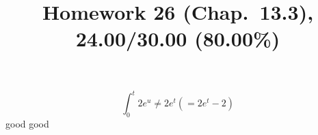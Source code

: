 \documentclass[10pt]{article} %
\title{Homework 26 (Chap.~13.3),
24.00/30.00 (80.00\%)
}
\begin{document}
\maketitle
{}
\begin{equation*}
	\int_{0}^t2e^u\neq2e^t \left( =2e^t-2 \right)
\end{equation*}
good
good
\end{document}
